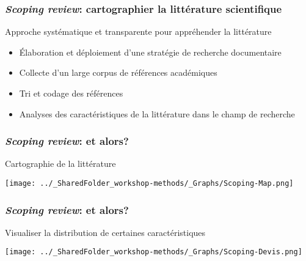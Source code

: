 \documentclass{beamer}
\begin{document}
    \begin{frame}
    
      \frametitle{\emph{Scoping review}: cartographier la littérature scientifique} \vspace{1cm}
      
    Approche systématique et transparente pour appréhender la littérature
    
        \begin{itemize}
          \item{Élaboration et déploiement d'une stratégie de recherche documentaire}
          \item{Collecte d'un large corpus de références académiques}
          \item{Tri et codage des références}
          \item{Analyses des caractéristiques de la littérature dans le champ de recherche}
        \end{itemize}
          
    \end{frame}  
    

    \begin{frame}
    
      \frametitle{\emph{Scoping review}: et \R alors?} \vspace{1cm}
      
      Cartographie de la littérature
      
        \begin{center}
         \texttt{[image: ../\_SharedFolder\_workshop-methods/\_Graphs/Scoping-Map.png]}
        \end{center} 
      
          
    \end{frame}  
    

    \begin{frame}
    
      \frametitle{\emph{Scoping review}: et \R alors?} \vspace{1cm}
      
      Visualiser la distribution de certaines caractéristiques
      
        \begin{center}
         \texttt{[image: ../\_SharedFolder\_workshop-methods/\_Graphs/Scoping-Devis.png]}
        \end{center} 
      
          
    \end{frame}  
    
\end{document}
